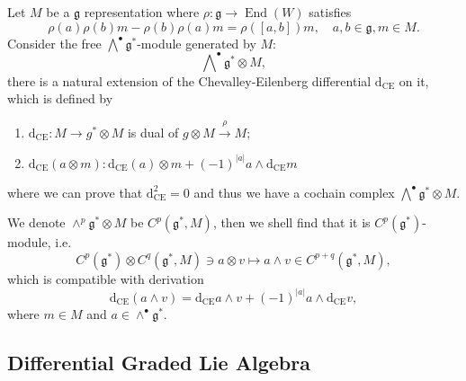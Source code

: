 \documentclass[10pt]{article}
\begin{document}
Let $ M$ be a $ \mathfrak{g}$ representation where $ \rho : \mathfrak{g} \rightarrow \operatorname{End}(W)$ satisfies
\begin{equation*}
  \rho(a) \rho(b) m - \rho(b) \rho(a) m = \rho([a,b]) m, \quad a,b \in \mathfrak{g}, m \in M.
\end{equation*}
Consider the free $\bigwedge^{\bullet} \mathfrak{g}^{*}$-module generated by $ M$:
\begin{equation*}
  \bigwedge\nolimits^{\bullet} \mathfrak{g}^{*} \otimes M,
\end{equation*}
there is a natural extension of the Chevalley-Eilenberg differential $ \mathrm{d} _{\mathrm{CE}}$ on it, which is defined by
\begin{enumerate}[(1)]
  \item $ \mathrm{d} _{\mathrm{CE}} : M \rightarrow g^{*}\otimes M$ is dual of $ g \otimes M \xrightarrow{\rho} M$;
  \item $ \mathrm{d} _{\mathrm{CE}}(a\otimes m) : \mathrm{d} _{\mathrm{CE}}(a) \otimes m + (-1)^{|a|} a \wedge \mathrm{d} _{\mathrm{CE}} m$
\end{enumerate}
where we can prove that $ \mathrm{d} _{\mathrm{CE}}^{2} = 0$ and thus we have a cochain complex $\bigwedge^{\bullet} \mathfrak{g}^{*} \otimes M$.

We denote $\wedge^{p} \mathfrak{g}^{*} \otimes M$ be $ C^{p}(\mathfrak{g}^{*}, M)$, then we shell find that it is $ C^{p}(\mathfrak{g}^{*})$-module, i.e.
\begin{equation*}
  C^{p}(\mathfrak{g}^{*}) \otimes C^{q}(\mathfrak{g}^{*}, M) \ni a \otimes v \mapsto a \wedge v \in C^{p+q}(\mathfrak{g}^{*}, M),
\end{equation*}
which is compatible with derivation
\begin{equation*}
  \mathrm{d} _{\mathrm{CE}} (a\wedge v) = \mathrm{d} _{\mathrm{CE}} a \wedge v + (-1)^{\left| a \right|} a \wedge \mathrm{d} _{\mathrm{CE}} v,
\end{equation*}
where $ m \in M$ and $ a \in \wedge^{\bullet} \mathfrak{g}^{*}$.

\subsection{Differential Graded Lie Algebra}
\end{document}
